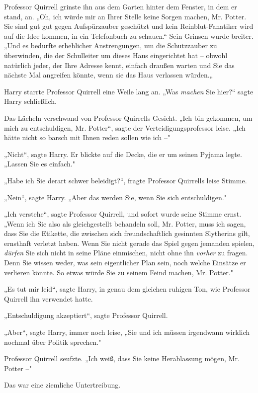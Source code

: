 {Professor Quirrell grinste ihn aus dem Garten hinter dem Fenster, in dem er stand, an. „Oh, ich würde mir an Ihrer Stelle keine Sorgen machen, Mr. Potter. Sie sind gut gut gegen Aufspürzauber geschützt und kein Reinblut-Fanatiker wird auf die Idee kommen, in ein Telefonbuch zu schauen.“ Sein Grinsen wurde breiter. „Und es bedurfte erheblicher Anstrengungen, um die Schutzzauber zu überwinden, die der Schulleiter um dieses Haus eingerichtet hat -- obwohl natürlich jeder, der Ihre Adresse kennt, einfach draußen warten und Sie das nächste Mal angreifen könnte, wenn sie das Haus verlassen würden.„

Harry starrte Professor Quirrell eine Weile lang an. „Was \emph{machen} Sie hier?“ sagte Harry schließlich.

Das Lächeln verschwand von Professor Quirrells Gesicht. „Ich bin gekommen, um mich zu entschuldigen, Mr. Potter“, sagte der Verteidigungsprofessor leise. „Ich hätte nicht so barsch mit Ihnen reden sollen wie ich --"

„Nicht“, sagte Harry. Er blickte auf die Decke, die er um seinen Pyjama legte. „Lassen Sie es einfach."

„Habe ich Sie derart schwer beleidigt?“, fragte Professor Quirrells leise Stimme.

„Nein“, sagte Harry. „Aber das werden Sie, wenn Sie sich entschuldigen."

„Ich verstehe“, sagte Professor Quirrell, und sofort wurde seine Stimme ernst. „Wenn ich Sie also als gleichgestellt behandeln soll, Mr. Potter, muss ich sagen, dass Sie die Etikette, die zwischen sich freundschaftlich gesinnten Slytherins gilt, ernsthaft verletzt haben. Wenn Sie nicht gerade das Spiel gegen jemanden spielen, \emph{dürfen} Sie sich nicht in seine Pläne einmischen, nicht ohne ihn \emph{vorher} zu fragen. Denn Sie wissen weder, was sein eigentlicher Plan sein, noch welche Einsätze er verlieren könnte. So etwas würde Sie zu seinem Feind machen, Mr. Potter."

„Es tut mir leid“, sagte Harry, in genau dem gleichen ruhigen Ton, wie Professor Quirrell ihn verwendet hatte.

„Entschuldigung akzeptiert“, sagte Professor Quirrell.

„Aber“, sagte Harry, immer noch leise, „Sie und ich müssen irgendwann wirklich nochmal über Politik sprechen."

Professor Quirrell seufzte. „Ich weiß, dass Sie keine Herablassung mögen, Mr. Potter --"

Das war eine ziemliche Untertreibung.

}
